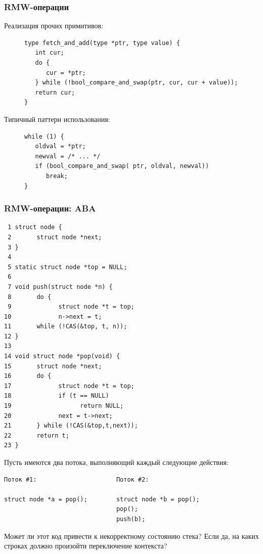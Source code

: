 \documentclass[aspectratio=169, pdf, 8pt, unicode]{beamer}
\begin{document}
\begin{frame}[fragile]
\frametitle{RMW-операции}
Реализация прочих примитивов:
\begin{figure}[H]
\centering
\begin{minipage}{0.8\textwidth}
\begin{verbatim}
type fetch_and_add(type *ptr, type value) {
   int cur;
   do {
      cur = *ptr;
   } while (!bool_compare_and_swap(ptr, cur, cur + value));
   return cur;
}
\end{verbatim}
\end{minipage}
\end{figure}
Типичный паттерн использования:
\begin{figure}[H]
\centering
\begin{minipage}{0.8\textwidth}
\begin{verbatim}
while (1) {
   oldval = *ptr;
   newval = /* ... */
   if (bool_compare_and_swap( ptr, oldval, newval))
      break;
}
\end{verbatim}
\end{minipage}
\end{figure}
\end{frame}

\begin{frame}[fragile]
\frametitle{RMW-операции: ABA}

\begin{minipage}{0.4\textwidth}
\begin{small}
\begin{verbatim}
 1 struct node {
 2       struct node *next;
 3 }
 4
 5 static struct node *top = NULL;
 6 
 7 void push(struct node *n) {
 8       do {
 9             struct node *t = top;
10             n->next = t;
11       while (!CAS(&top, t, n));
12 }
13
14 void struct node *pop(void) {
15       struct node *next;
16       do {
17             struct node *t = top;
18             if (t == NULL)
19                   return NULL;
20             next = t->next;
21       } while (!CAS(&top,t,next));
22       return t;
23 }
\end{verbatim}
\end{small}
\end{minipage}%
\begin{minipage}{0.4\textwidth}
Пусть имеются два потока, выполняющий каждый следующие действия:

\begin{small}
\begin{verbatim}
Поток #1:                      Поток #2:

struct node *a = pop();        struct node *b = pop();
                               pop();
                               push(b);
\end{verbatim}
\end{small}

Может ли этот код привести к некорректному состоянию стека? Если да, на каких строках должно произойти переключение контекста?
\end{minipage}%
\end{frame}
\end{document}

